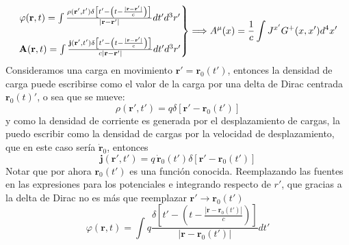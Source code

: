 \begin{equation}
    \left.
        \begin{matrix}
            \varphi(\textbf{r},t) = \int
            \frac%
            {%
                \rho(\textbf{r}',t')\delta
                \left[
                    t' - 
                    \left(
                        t - \frac{|\textbf{r}-\textbf{r}'|}{c}
                    \right)
                \right]
            }
            {%
                |\textbf{r}-\textbf{r}'|
            }dt'd^{3}r'\\
            \\
            \textbf{A}(\textbf{r},t) = \int 
            \frac%
            {%
                \textbf{j}(\textbf{r}',t')\delta
                \left[
                    t' - 
                    \left(
                        t - \frac{|\textbf{r}-\textbf{r}'|}{c}
                    \right)
                \right]
            }
            {%
                c|\textbf{r}-\textbf{r}'|
            }dt'd^{3}r'
        \end{matrix}
    \right\}
    \Longrightarrow
    A^{\mu}(x) = \frac{1}{c}\int J^{x'}G^{+}(x,x')d^{4}x'
        \label{ec:PotencialesRetardados}
\end{equation}
Consideramos una carga en movimiento $\textbf{r}' = \textbf{r}_{0}(t')$, entonces la densidad de carga puede escribirse como el valor de la carga por una delta de Dirac centrada $\textbf{r}_{0}(t)'$, o sea que se mueve:
\begin{equation*}
    \rho(\textbf{r}',t') = q \delta
    \left[
        \textbf{r}' - \textbf{r}_{0}(t')
    \right]
\end{equation*}
y como la densidad de corriente es generada por el desplazamiento de cargas, la puedo escribir como la densidad de cargas por la velocidad de desplazamiento, que en este caso sería $\dot{\textbf{r}}_{0}$, entonces
\begin{equation*}
    \textbf{j}(\textbf{r}', t') = q\,\dot{\textbf{r}}_{0}(t')\delta[\textbf{r}'-\textbf{r}_{0}(t')]
\end{equation*}
Notar que por ahora $\textbf{r}_{0}(t')$ es una función conocida. Reemplazando las fuentes en las expresiones para los potenciales e integrando respecto de $r'$, que gracias a la delta de Dirac no es más que reemplazar $\textbf{r}' \to \textbf{r}_{0}(t')$
\begin{equation*}
    \varphi(\textbf{r},t) = \int q 
    \frac
    {
        \delta 
        \left[
            t' - 
            \left(
                t - \frac{|\textbf{r}-\textbf{r}_{0}(t')|}{c}
            \right)
        \right]
    }
    {
        |\textbf{r}-\textbf{r}_{0}(t')|
    }dt'
\end{equation*}
